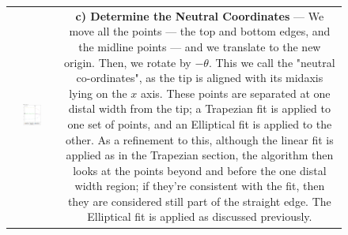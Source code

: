\begin{figure}[p!]
\begin{tabular}{cc}
    \\ 
   \includegraphics[width=0.45\textwidth, height=0.5\textwidth]{Chapter4/Figs/Model_NeutralCoords_FSkin_Ring.jpg} &
    \parbox[b][0.5\textwidth][s]{0.55\textwidth}{
         \textbf{c) Determine the Neutral Coordinates} --- We move all the points --- the top and bottom edges, and the midline points --- and we translate to the new origin. Then, we rotate by $-\theta$. This we call the "neutral co-ordinates", as the tip is aligned with its midaxis lying on the $x$ axis. These points are separated at one distal width from the tip; a Trapezian fit is applied to one set of points, and an Elliptical fit is applied to the other. As a refinement to this, although the linear fit is applied as in the Trapezian section, the algorithm then looks at the points beyond and before the one distal width region; if they're consistent with the fit, then they are considered still part of the straight edge. The Elliptical fit is applied as discussed previously. \vfill
    }
    \end{tabular}\\
\end{figure}


